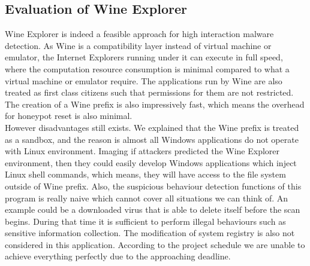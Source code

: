 \subsection{Evaluation of Wine Explorer}
Wine Explorer is indeed a feasible approach for high interaction malware 
detection. As Wine is a compatibility layer instead of virtual machine or 
emulator, the Internet Explorers running under it can execute in full speed, 
where the computation resource consumption is minimal compared to what 
a virtual machine or emulator require. The applications run by Wine are also 
treated as first class citizens such that permissions for them are not 
restricted. The creation of a Wine prefix is also impressively fast, which 
means the overhead for honeypot reset is also minimal. \\
However disadvantages still exists. We explained that the Wine prefix is treated
as a sandbox, and the reason is almost all Windows applications do not operate 
with Linux environment. Imaging if attackers predicted the Wine Explorer 
environment, then they could easily develop Windows applications which inject 
Linux shell commands, which means, they will have access to the file system 
outside of Wine prefix. Also, the suspicious behaviour detection functions of 
this program is really naive which cannot cover all situations we can think 
of. An example could
be a downloaded virus that is able to delete itself before the scan begins. 
During that time it is sufficient to perform illegal behaviours such as 
sensitive information collection. The modification of system 
registry is also not considered in this application. According to the project 
schedule we are unable to achieve everything perfectly due to the approaching 
deadline. 
